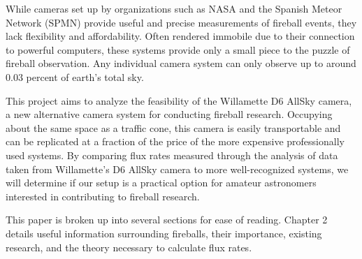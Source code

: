 While cameras set up by organizations such as NASA and the Spanish Meteor Network (SPMN) provide useful and precise measurements of fireball events, they lack flexibility and affordability.  
Often rendered immobile due to their connection to powerful computers, these systems provide only a small piece to the puzzle of fireball observation.
Any individual camera system can only observe up to around 0.03 percent of earth’s total sky. 

This project aims to analyze the feasibility of the Willamette D6 AllSky camera, a new alternative camera system for conducting fireball research. 
Occupying about the same space as a traffic cone, this camera is easily transportable and can be replicated at a fraction of the price of the more expensive professionally used systems.
By comparing flux rates measured through the analysis of data taken from Willamette’s D6 AllSky camera to more well-recognized systems, we will determine if our setup is a practical option for amateur astronomers interested in contributing to fireball research.

This paper is broken up into several sections for ease of reading. Chapter 2 details useful information surrounding fireballs, their importance, existing research, and the theory necessary to calculate flux rates. \cite{trigo-rodriguez_2006_2007}
